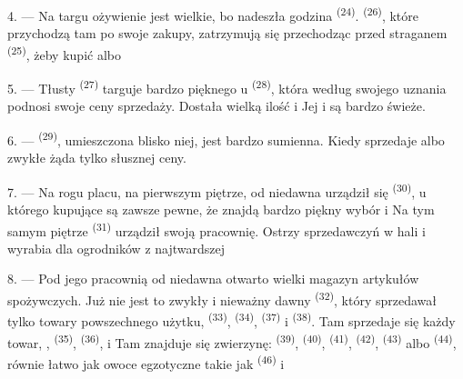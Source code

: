 \VUsaut{4.0mm}
\VUsaut{3.0mm}

4. --- Na targu ożywienie jest wielkie, bo nadeszła godzina  \textsuperscript{(24)}.  \textsuperscript{(26)},
które przychodzą tam po swoje zakupy, zatrzymują się przechodząc przed straganem
 \textsuperscript{(25)}, żeby kupić  albo

5. --- Tłusty  \textsuperscript{(27)} targuje bardzo pięknego
 u  \textsuperscript{(28)}, która według
swojego uznania podnosi swoje ceny sprzedaży. Dostała wielką ilość  i  Jej  i  są bardzo świeże.

\VUsaut{4.0mm}
\VUsaut{3.0mm}

6. ---  \textsuperscript{(29)}, umieszczona blisko niej,
jest bardzo sumienna. Kiedy sprzedaje  albo zwykłe
 żąda tylko słusznej ceny.

7. --- Na rogu placu, na pierwszym piętrze, od niedawna urządził się  \textsuperscript{(30)}, u którego kupujące są zawsze pewne, że znajdą bardzo
piękny wybór   i  Na tym
samym piętrze  \textsuperscript{(31)} urządził swoją pracownię. Ostrzy
 sprzedawczyń w hali i wyrabia dla ogrodników  z
najtwardszej 

\VUsaut{4.0mm}
\VUsaut{3.0mm}

8. --- Pod jego pracownią od niedawna otwarto wielki magazyn artykułów spożywczych. Już
nie jest to zwykły i nieważny dawny  \textsuperscript{(32)},
który sprzedawał tylko towary powszechnego użytku, 
\textsuperscript{(33)},  \textsuperscript{(34)},  \textsuperscript{(37)} i  \textsuperscript{(38)}. Tam sprzedaje
się każdy towar, ,  \textsuperscript{(35)},
 \textsuperscript{(36)},   i  Tam znajduje się zwierzynę: 
\textsuperscript{(39)},  \textsuperscript{(40)}, 
\textsuperscript{(41)},  \textsuperscript{(42)},  \textsuperscript{(43)} albo  \textsuperscript{(44)}, równie
łatwo jak owoce egzotyczne takie jak  \textsuperscript{(46)} i

